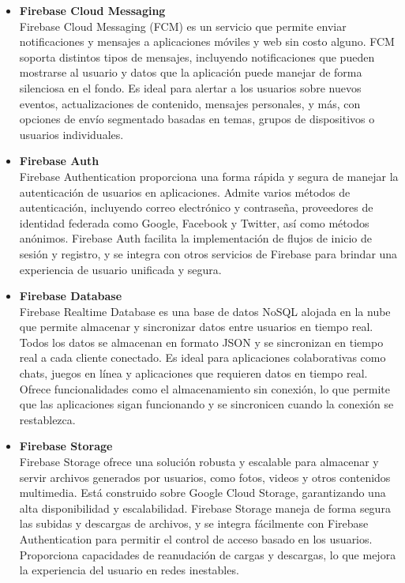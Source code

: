 \documentclass[12pt,twoside,titlepage]{report}
\begin{document}
\begin{itemize}

\item \textbf{Firebase Cloud Messaging} \\
Firebase Cloud Messaging (FCM) es un servicio que permite enviar notificaciones y mensajes a aplicaciones móviles y web sin costo alguno. FCM soporta distintos tipos de mensajes, incluyendo notificaciones que pueden mostrarse al usuario y datos que la aplicación puede manejar de forma silenciosa en el fondo. Es ideal para alertar a los usuarios sobre nuevos eventos, actualizaciones de contenido, mensajes personales, y más, con opciones de envío segmentado basadas en temas, grupos de dispositivos o usuarios individuales.

\item \textbf{Firebase Auth} \\
Firebase Authentication proporciona una forma rápida y segura de manejar la autenticación de usuarios en aplicaciones. Admite varios métodos de autenticación, incluyendo correo electrónico y contraseña, proveedores de identidad federada como Google, Facebook y Twitter, así como métodos anónimos. Firebase Auth facilita la implementación de flujos de inicio de sesión y registro, y se integra con otros servicios de Firebase para brindar una experiencia de usuario unificada y segura.

\item \textbf{Firebase Database} \\
Firebase Realtime Database es una base de datos NoSQL alojada en la nube que permite almacenar y sincronizar datos entre usuarios en tiempo real. Todos los datos se almacenan en formato JSON y se sincronizan en tiempo real a cada cliente conectado. Es ideal para aplicaciones colaborativas como chats, juegos en línea y aplicaciones que requieren datos en tiempo real. Ofrece funcionalidades como el almacenamiento sin conexión, lo que permite que las aplicaciones sigan funcionando y se sincronicen cuando la conexión se restablezca.

\item \textbf{Firebase Storage} \\
Firebase Storage ofrece una solución robusta y escalable para almacenar y servir archivos generados por usuarios, como fotos, videos y otros contenidos multimedia. Está construido sobre Google Cloud Storage, garantizando una alta disponibilidad y escalabilidad. Firebase Storage maneja de forma segura las subidas y descargas de archivos, y se integra fácilmente con Firebase Authentication para permitir el control de acceso basado en los usuarios. Proporciona capacidades de reanudación de cargas y descargas, lo que mejora la experiencia del usuario en redes inestables.


\end{itemize}
\end{document}
